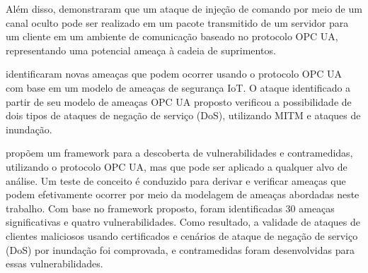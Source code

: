     Além disso,  demonstraram que um ataque de injeção de comando por meio de um canal oculto pode ser realizado em um pacote transmitido de um servidor para um cliente em um ambiente de comunicação baseado no protocolo OPC UA, representando uma potencial ameaça à cadeia de suprimentos.
    
     identificaram novas ameaças que podem ocorrer usando o protocolo OPC UA com base em um modelo de ameaças de segurança IoT. O ataque identificado a partir de seu modelo de ameaças OPC UA proposto verificou a possibilidade de dois tipos de ataques de negação de serviço (DoS), utilizando MITM e ataques de inundação.

     propõem um framework para a descoberta de vulnerabilidades e contramedidas, utilizando o protocolo OPC UA, mas que pode ser aplicado a qualquer alvo de análise. Um teste de conceito é conduzido para derivar e verificar ameaças que podem efetivamente ocorrer por meio da modelagem de ameaças abordadas neste trabalho. Com base no framework proposto, foram identificadas 30 ameaças significativas e quatro vulnerabilidades. Como resultado, a validade de ataques de clientes maliciosos usando certificados e cenários de ataque de negação de serviço (DoS) por inundação foi comprovada, e contramedidas foram desenvolvidas para essas vulnerabilidades.